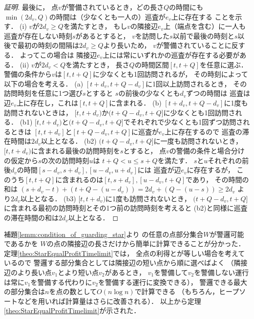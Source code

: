 \begin{proof}[証明]
  最後に，
  点$v$が警備されているとき，どの長さ$Q$の時間にも
  $\min(2d_v, Q)$の時間は（少なくとも一人の）巡査が$e_v$上に存在する
  ことを示す．
  (i) $v$が$2d_v \geq Q$を満たすとき，
    もし$v$の隣接辺$e_v$上（端点を含む）に一人も巡査が存在しない時刻$s$があるとすると，
    $v$を訪問した$s$以前で最後の時刻と$s$以後で最初の時刻の間隔は$2d_v \geq Q$より長いため，
    $v$が警備されていることに反する．
    よってこの場合は
    隣接辺$e_v$上には常にいずれかの巡査が存在する必要がある．
  (ii) $v$が$2d_v < Q$を満たすとき，
    長さ$Q$の時間区間$[t, t + Q]$を任意に選ぶ．
    警備の条件から$v$は$[t, t + Q]$に少なくとも1回訪問されるが，
    その時刻によって以下の場合を考える．
    (a) $[t + d_v, t + Q - d_v]$に1回以上訪問されるとき，
      その訪問時刻を任意に1つ選び$s$とすると
      $s$の前後の少なくとも$d_v$ずつの時間は
      巡査は辺$e_v$上に存在し，これは$[t, t + Q]$に含まれる．
    (b) $[t + d_v, t + Q - d_v]$に1度も訪問されないときは，
      $[t, t + d_v)$か$(t + Q - d_v, t + Q]$に少なくとも1回訪問される．
      (b1) $[t, t + d_v)$と$(t + Q - d_v, t + Q]$でそれぞれで少なくとも1回ずつ訪問されるときは
        $[t, t + d_v]$と$[t + Q - d_v, t + Q]$に巡査が$e_v$上に存在するので
        巡査の滞在時間は$2d_v$以上となる．
      (b2) $(t + Q - d_v, t + Q]$に一度も訪問されないとき，
        $[t, t + d_v)$に含まれる最後の訪問時刻を$s$とすると，
        点$v$の警備の条件と場合分けの仮定から$s$の次の訪問時刻$u$は
        $t + Q < u \leq s + Q$を満たす．
        $s$と$u$それぞれの前後$d_v$の時間$[s - d_v, s + d_v], [u - d_v, u + d_v]$には
        巡査が辺$e_v$に存在するが，
        このうち$[t, t + Q]$に含まれるのは$[t, s + d_v], [u - d_v, t + Q]$であり，
        その時間の和は
        $(s + d_v - t) + (t + Q - (u - d_v)) = 2d_v + (Q - (u - s)) \geq 2d_v$
        より$2d_v$以上となる．
      (b3) $[t, t + d_v)$に1度も訪問されないとき，
        $(t + Q - d_v, t + Q]$に含まれる最初の訪問時刻とその1つ前の訪問時刻を考えると
        (b2)と同様に巡査の滞在時間の和は$2d_v$以上となる．

\end{proof}



補題\ref{lemm:condition_of_guarding_star}より
{\graphStar}の任意の点部分集合$W$が警邏可能であるかを
$W$の点の隣接辺の長さだけから簡単に計算できることが分かった．
定理\ref{theo:StarEqualProfitTimelimit}では，
全点の利得と{\idletime}が等しい場合を考えているので
警邏する部分集合としては隣接辺の短い点から順に選べばよく
（隣接辺のより長い点$v_1$とより短い点$v_2$があるとき，
$v_1$を警備して$v_2$を警備しない運行は常に$v_1$を警備する代わりに$v_2$を警備する運行に変換できる），
警邏できる最大の部分集合は$n$を点の数として$O(n \log n)$で計算できる
（もちろん，ヒープソートなどを用いれば計算量はさらに改善される）．
以上から定理\ref{theo:StarEqualProfitTimelimit}が示された．
